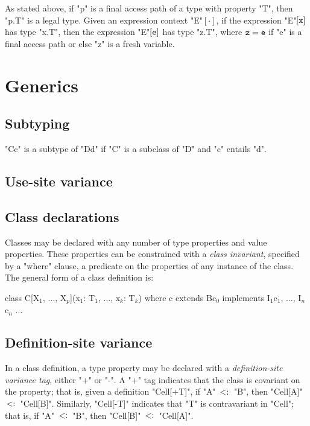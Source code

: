 \documentclass[preprint,nocopyrightspace,9pt]{sigplanconf}
\begin{document}
As stated above, if \xcd"p" is a final access path of a
type with property \xcd"T", then \xcd"p.T" is a legal type.
Given an expression context \xcd"E"$[\cdot]$, if
the expression \xcd"E"$[{\tt x}]$ has type \xcd"x.T",
then the expression \xcd"E"$[{\tt e}]$ has type \xcd"z.T",
where ${\tt z} = {\tt e}$ if \xcd"e" is a final access path
or else \xcd"z" is a fresh variable.
\fi

\section{Generics}

\subsection{Subtyping}

\xcd"C{c}" is a subtype of \xcd"D{d}" if \xcd"C" is a subclass
of \xcd"D" and \xcd"c" entails \xcd"d".

\subsection{Use-site variance}

\subsection{Class declarations}

Classes may be declared with any number of type properties and
value properties.  These properties can be constrained with a
\emph{class invariant}, specified by a \xcd"where" clause,
a predicate on the properties of any instance of the class.
%
The general form of a class definition is:
\begin{xtenmath}
class C[X$_1$, $\dots$, X$_p$](x$_1$: T$_1$, $\dots$, x$_k$: T$_k$)
      where c
      extends B{c$_0$}
      implements I$_1${c$_1$}, $\dots$, I$_n${c$_n$} {$\dots$}
\end{xtenmath}

\subsection{Definition-site variance}

In a class definition,
a type property may be declared with a \emph{definition-site variance tag}, either \xcd"+" or
\xcd"-".  A \xcd"+" tag indicates that the class is covariant on
the property; that is, given a definition
\xcd"Cell[+T]",
if \xcd"A" $\subtype$ \xcd"B", then
\xcd"Cell[A]" $\subtype$ \xcd"Cell[B]".
Similarly,
\xcd"Cell[-T]" indicates that \xcd"T" is contravariant in \xcd"Cell";
that is, if \xcd"A" $\subtype$ \xcd"B", then
\xcd"Cell[B]" $\subtype$ \xcd"Cell[A]".
\end{document}
